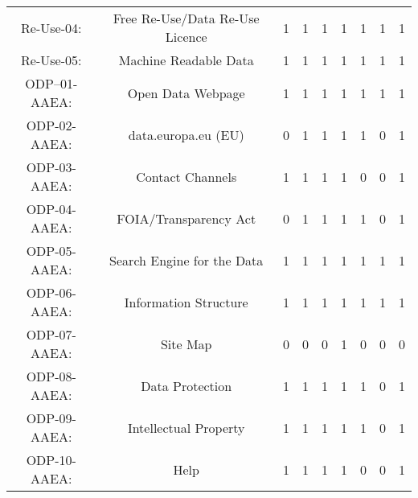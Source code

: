 \documentclass[a4paper, twoside]{report}
\begin{document}
\begin{table}[htbp]
\begin{adjustbox}{max width=\linewidth}
\begin{tabular}{rcccccccc}
    \multicolumn{1}{c}{Re-Use-04:} & \multicolumn{1}{p{19em}}{\cellcolor[rgb]{ .749,  .749,  .749}Free Re-Use/Data Re-Use Licence} & \cellcolor[rgb]{ .749,  .749,  .749}1 & \cellcolor[rgb]{ .749,  .749,  .749}1 & \cellcolor[rgb]{ .749,  .749,  .749}1 & \cellcolor[rgb]{ .749,  .749,  .749}1 & \cellcolor[rgb]{ .749,  .749,  .749}1 & \cellcolor[rgb]{ .749,  .749,  .749}1 & \cellcolor[rgb]{ .749,  .749,  .749}1 \\
    \multicolumn{1}{c}{Re-Use-05:} & \multicolumn{1}{p{19em}}{\cellcolor[rgb]{ .749,  .749,  .749}Machine Readable Data} & \cellcolor[rgb]{ .749,  .749,  .749}1 & \cellcolor[rgb]{ .749,  .749,  .749}1 & \cellcolor[rgb]{ .749,  .749,  .749}1 & \cellcolor[rgb]{ .749,  .749,  .749}1 & \cellcolor[rgb]{ .749,  .749,  .749}1 & \cellcolor[rgb]{ .749,  .749,  .749}1 & \cellcolor[rgb]{ .749,  .749,  .749}1 \\
    \multicolumn{1}{c}{ODP--01-AAEA:} & \multicolumn{1}{p{19em}}{Open Data Webpage} & 1     & 1     & 1     & 1     & 1     & 1     & 1 \\
    \multicolumn{1}{c}{ODP-02-AAEA:} & \multicolumn{1}{p{19em}}{data.europa.eu (EU)} & 0     & 1     & 1     & 1     & 1     & 0     & 1 \\
    \multicolumn{1}{c}{ODP-03-AAEA:} & \multicolumn{1}{p{19em}}{Contact Channels} & 1     & 1     & 1     & 1     & 0     & 0     & 1 \\
    \multicolumn{1}{c}{ODP-04-AAEA:} & \multicolumn{1}{p{19em}}{FOIA/Transparency Act} & 0     & 1     & 1     & 1     & 1     & 0     & 1 \\
    \multicolumn{1}{c}{ODP-05-AAEA:} & \multicolumn{1}{p{19em}}{Search Engine for the Data} & 1     & 1     & 1     & 1     & 1     & 1     & 1 \\
    \multicolumn{1}{c}{ODP-06-AAEA:} & \multicolumn{1}{p{19em}}{Information Structure} & 1     & 1     & 1     & 1     & 1     & 1     & 1 \\
    \multicolumn{1}{c}{ODP-07-AAEA:} & \multicolumn{1}{p{19em}}{Site Map} & 0     & 0     & 0     & 1     & 0     & 0     & 0 \\
    \multicolumn{1}{c}{ODP-08-AAEA:} & \multicolumn{1}{p{19em}}{Data Protection} & 1     & 1     & 1     & 1     & 1     & 0     & 1 \\
    \multicolumn{1}{c}{ODP-09-AAEA:} & \multicolumn{1}{p{19em}}{Intellectual Property} & 1     & 1     & 1     & 1     & 1     & 0     & 1 \\
    \multicolumn{1}{c}{ODP-10-AAEA:} & \multicolumn{1}{p{19em}}{Help} & 1     & 1     & 1     & 1     & 0     & 0     & 1 \\

\end{tabular}
\end{adjustbox}
\end{table}
\end{document}

